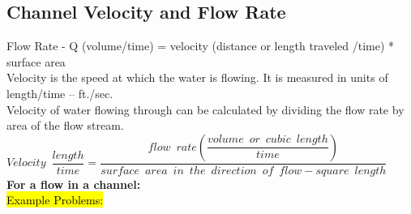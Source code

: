 \subsection{Channel Velocity and Flow Rate}
Flow Rate - Q (volume/time) = velocity (distance or length traveled /time) * surface area\\
Velocity is the speed at which the water is flowing.  It is measured in units of length/time – ft./sec.\\
Velocity of water flowing through can be calculated by dividing the flow rate by area of the flow stream.\\
\vspace{0.5cm}
$Velocity \enspace \dfrac{length}{time}= \dfrac{flow \enspace rate(\dfrac{volume \enspace or \enspace cubic \enspace length}{time})}{surface \enspace area \enspace in \enspace the \enspace direction \enspace of \enspace flow-square \enspace length}$\\
\vspace{0.5cm}
\textbf{For a flow in a channel:}\\
\vspace{0.5cm}
\hl{Example Problems:}\\
